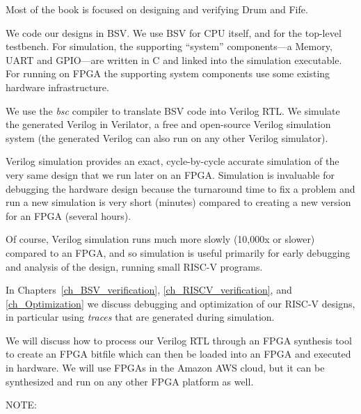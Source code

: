 \vspace{1ex}


Most of the book is focused on designing and verifying Drum and Fife.

We code our designs in BSV.  We use BSV for CPU itself, and for the
top-level testbench.  For simulation, the supporting ``system''
components---a Memory, UART and GPIO---are written in C and linked
into the simulation executable.  For running on FPGA the supporting
system components use some existing hardware infrastructure.

We use the \emph{bsc} compiler to translate BSV code into Verilog RTL.
We simulate the generated Verilog in Verilator, a free and open-source
Verilog simulation system (the generated Verilog can also run on any
other Verilog simulator).

Verilog simulation provides an exact, cycle-by-cycle accurate
simulation of the very same design that we run later on an FPGA.
Simulation is invaluable for debugging the hardware design because the
turnaround time to fix a problem and run a new simulation is very
short (minutes) compared to creating a new version for an FPGA
(several hours).

Of course, Verilog simulation runs much more slowly (10,000x or
slower) compared to an FPGA, and so simulation is useful primarily for
early debugging and analysis of the design, running small RISC-V
programs.

In Chapters~\ref{ch_BSV_verification}, \ref{ch_RISCV_verification},
and \ref{ch_Optimization} we discuss debugging and optimization of our
RISC-V designs, in particular using \emph{traces} that are generated
during simulation.

We will discuss how to process our Verilog RTL through an FPGA
synthesis tool to create an FPGA bitfile which can then be loaded into
an FPGA and executed in hardware.  We will use FPGAs in the Amazon AWS
cloud, but it can be synthesized and run on any other FPGA platform as
well.


\vspace{1ex}

NOTE: 

